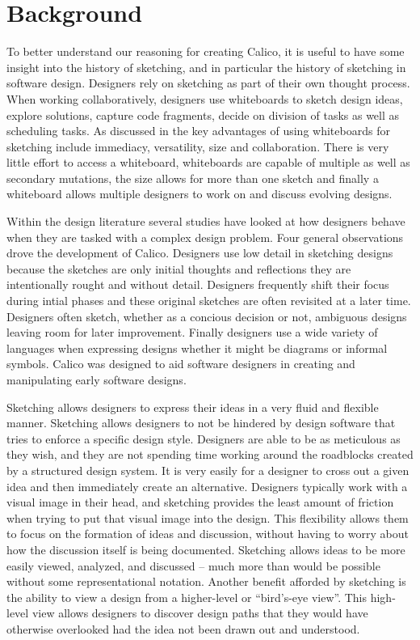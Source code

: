 \chapter{Background}

To better understand our reasoning for creating Calico, it is useful to have some insight into the history of sketching, and in particular the history of sketching in software design. Designers rely on sketching as part of their own thought process.
When working collaboratively, designers use whiteboards to sketch design ideas, explore solutions, capture code fragments, decide on division of tasks as well as scheduling tasks. As discussed in\cite{chen1} the key advantages of using whiteboards for sketching include immediacy, versatility, size and collaboration. There is very little effort to access a whiteboard, whiteboards are capable of multiple as well as secondary mutations, the size allows for more than one sketch and finally a whiteboard allows multiple designers to work on and discuss evolving designs. 

Within the design literature several studies have looked at how designers behave when they are tasked with a complex design problem. Four general observations drove the development of Calico. Designers use low detail in sketching designs because the sketches are only initial thoughts and reflections\cite{a8} they are intentionally rought and without detail. Designers frequently shift their focus during intial phases and these original sketches are often revisited at a later time\cite{a9}. Designers often sketch, whether as a concious decision or not, ambiguous designs leaving room for later improvement\cite{a3}. Finally designers use a wide variety of languages when expressing designs whether it might be diagrams or informal symbols\cite{a6}. Calico was designed to aid software designers in creating and manipulating early software designs.

Sketching allows designers to express their ideas in a very fluid and flexible manner.
Sketching allows designers to not be hindered by design software that tries to enforce a specific design style. Designers are able to be as meticulous as they wish, and they are not spending time working around the roadblocks created by a structured design system.
It is very easily for a designer to cross out a given idea and then immediately create an alternative. Designers typically work with a visual image in their head\cite{todo}, and sketching provides the least amount of friction when trying to put that visual image into the design.
This flexibility allows them to focus on the formation of ideas and discussion, without having to worry about how the discussion itself is being documented. 
Sketching allows ideas to be more easily viewed, analyzed, and discussed -- much more than would be possible without some representational notation.
Another benefit afforded by sketching is the ability to view a design from a higher-level or ``bird’s-eye view''.
This high-level view allows designers to discover design paths that they would have otherwise overlooked had the idea not been drawn out and understood. 

